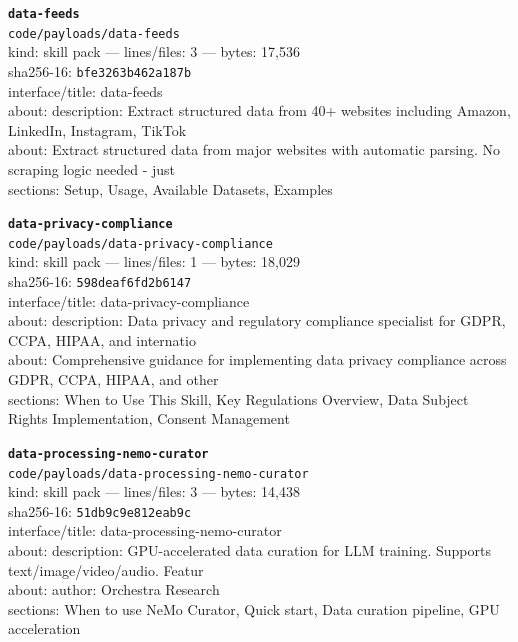 \noindent\textbf{\texttt{data-feeds}}\\
\texttt{code/payloads/data-feeds}\\
kind: skill pack --- lines/files: 3 --- bytes: 17,536\\
sha256-16: \texttt{bfe3263b462a187b}\\
interface/title: data-feeds\\
about: description: Extract structured data from 40+ websites including Amazon, LinkedIn, Instagram, TikTok\\
about: Extract structured data from major websites with automatic parsing. No scraping logic needed - just \\
sections: Setup, Usage, Available Datasets, Examples\\
\vspace*{6.0pt}

\noindent\textbf{\texttt{data-privacy-compliance}}\\
\texttt{code/payloads/data-privacy-compliance}\\
kind: skill pack --- lines/files: 1 --- bytes: 18,029\\
sha256-16: \texttt{598deaf6fd2b6147}\\
interface/title: data-privacy-compliance\\
about: description: Data privacy and regulatory compliance specialist for GDPR, CCPA, HIPAA, and internatio\\
about: Comprehensive guidance for implementing data privacy compliance across GDPR, CCPA, HIPAA, and other \\
sections: When to Use This Skill, Key Regulations Overview, Data Subject Rights Implementation, Consent Management\\
\vspace*{6.0pt}
\newpage

\noindent\textbf{\texttt{data-processing-nemo-curator}}\\
\texttt{code/payloads/data-processing-nemo-curator}\\
kind: skill pack --- lines/files: 3 --- bytes: 14,438\\
sha256-16: \texttt{51db9c9e812eab9c}\\
interface/title: data-processing-nemo-curator\\
about: description: GPU-accelerated data curation for LLM training. Supports text/image/video/audio. Featur\\
about: author: Orchestra Research\\
sections: When to use NeMo Curator, Quick start, Data curation pipeline, GPU acceleration\\
\vspace*{6.0pt}

